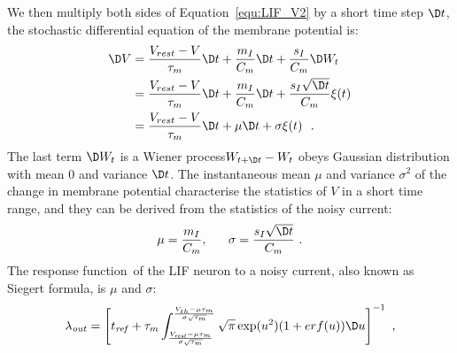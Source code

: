 	We then multiply \DIFdelbegin {}\DIFdelend both sides of Equation~\ref{equ:LIF_V2} by a short time step $\D t$, the stochastic differential equation of the membrane potential is: %
	\begin{equation}
	\begin{aligned}
	\D V&= \frac{V_{rest} - V}{\tau_m }\D t + \frac{m_I}{C_m} \D t + \frac{s_I}{C_m}  \D W_t \\
	&=\frac{V_{rest} - V}{\tau_m }\D t + \frac{m_I}{C_m} \D t + \frac{s_I \sqrt{\D t}}{C_m} \xi(t)  \\
	&=\frac{V_{rest} - V}{\tau_m }\D t + \mu \D t + \sigma \xi(t) ~~. 
	\end{aligned}
	\end{equation}	
	The last term $\D W_t$ is a Wiener process\DIFdelbegin {}\DIFdelend \DIFaddbegin \DIFadd{; }\DIFaddend $W_{t +\D t} - W_{t}$ obeys \DIFaddbegin {}\DIFaddend Gaussian distribution with mean 0 and variance $\D t$.
	The instantaneous mean $\mu$ and variance $\sigma^2$ of the change in membrane potential characterise the statistics of $V$ in a short time range, and they can be derived from the statistics of the noisy current:
	\begin{equation}
	\mu =\dfrac{m_I}{C_m}, ~~~~~ \sigma = \dfrac{s_I \sqrt{\D t}}{C_m}~.
	\end{equation}
	The response function~\DIFdelbegin {}\DIFdelend \DIFaddbegin {}\DIFaddend of the LIF neuron to a noisy current, also known as \DIFaddbegin {}\DIFaddend Siegert formula, is \DIFdelbegin {}\DIFdelend \DIFaddbegin {}\DIFaddend $\mu$ and $\sigma$:
	\begin{equation}
	\lambda_\mathit{out}=
	\left [ t_\mathit{ref}+\tau_m \int_{\frac{V_\mathit{rest}-\mu \tau_m }{\sigma \sqrt{\tau_m}}}^{\frac{V_{th}-\mu \tau_m }{\sigma \sqrt{\tau_m}}} \sqrt{\pi} \exp(u^{2}) (1+erf(u)) \D u \right ]^{-1} ~,
	\label{equ:siegert}
	\end{equation}


